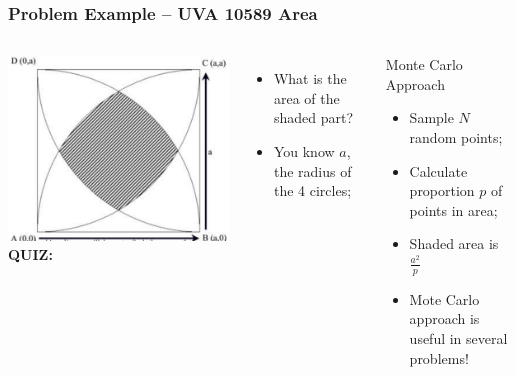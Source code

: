 \begin{frame}
  \frametitle{Problem Example -- UVA 10589 Area}

  \begin{columns}
      \includegraphics[width=1\textwidth]{img/area_uva}
    {\bf QUIZ:}
    \begin{itemize}
      \item What is the area of the shaded part?
      \item You know $a$, the radius of the 4 circles;
    \end{itemize}\bigskip

    \begin{block}{Monte Carlo Approach}
      \begin{itemize}
      \item Sample $N$ random points;
      \item Calculate proportion $p$ of points in area;
      \item Shaded area is $\frac{a^2}{p}$\bigskip

      \item Mote Carlo approach is useful in several problems!
      \end{itemize}
    \end{block}
  \end{columns}
\end{frame}


